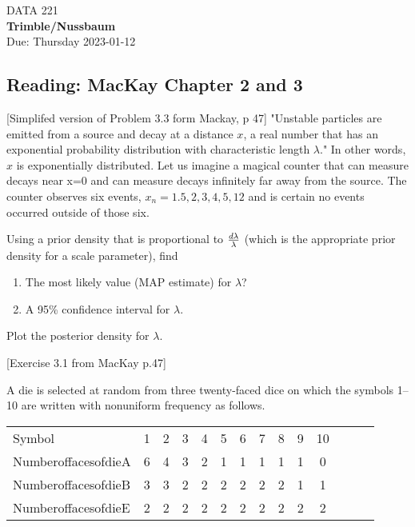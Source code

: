 \documentclass[12pt]{book}
\theoremstyle{definition}
\begin{document}
\begin{center}
{\Large DATA 221   }\\
\textbf{Trimble/Nussbaum}\\ %
Due: Thursday 2023-01-12 
\end{center}

\vspace{0.2 cm}

\subsection*{Reading:  MacKay Chapter 2 and 3}


\item\label{breaths}
[Simplifed version of Problem 3.3 form Mackay, p 47] 
"Unstable particles are emitted from a source and decay at a distance $x$, a real number that has an exponential probability distribution with characteristic length $\lambda $."  In other words, $x$ is exponentially distributed.
Let us imagine a magical counter that can measure decays near x=0 and can measure decays infinitely far away from the source.  The counter observes six events, ${x_n} =  {1.5,2,3,4,5,12}$ and is certain no events occurred outside of those six. 

Using a prior density that is proportional to ${d\lambda }\over {\lambda}$ (which is the appropriate prior density for a scale parameter), find 
\begin{enumerate}
\item	The most likely value (MAP estimate) for $\lambda$? 
\item   A 95\% confidence interval for $\lambda$.
\end{enumerate}
 
Plot the posterior density for $\lambda$.

\item\label{toscientific}
[Exercise 3.1 from MacKay p.47] 

A die is selected at random from three twenty-faced dice on which the symbols 1–10 are written with nonuniform frequency as follows.

\begin{tabular} {l c c c c c c c c c c c c c }
Symbol& 1& 2 &3 &4 &5 &6 &7 &8 &9 &10 \\
NumberoffacesofdieA& 6& 4 &3 &2 &1 &1 &1 &1 &1 &0  \\
NumberoffacesofdieB& 3 &3 &2 &2 &2 &2 &2 &2 &1 &1 \\
NumberoffacesofdieE& 2 &2 &2 &2 &2 &2 &2& 2& 2& 2 \\
\end{tabular}
\end{document}

